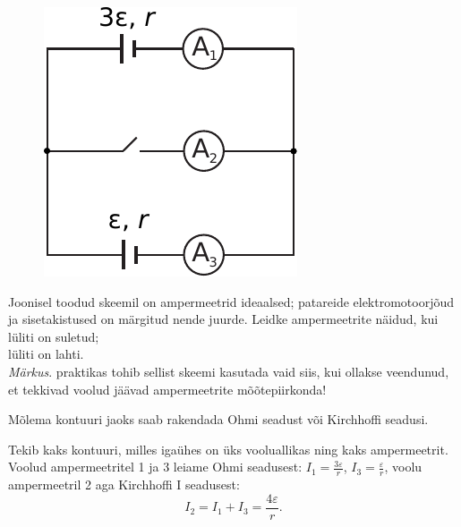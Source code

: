 
\begin{figure}%
\vspace{-12pt}
\includegraphics[width=\linewidth]{2013-v2g-05-skeem}%
\end{figure}
Joonisel toodud skeemil on ampermeetrid ideaalsed; patareide elektromotoorjõud
ja sisetakistused on märgitud nende juurde. Leidke ampermeetrite näidud, kui\\
\osa lüliti on suletud;\\
\osa lüliti on lahti.\\
\emph{Märkus}. praktikas tohib
sellist skeemi kasutada vaid siis, kui ollakse veendunud, et tekkivad voolud
jäävad ampermeetrite mõõtepiirkonda!

\hint
Mõlema kontuuri jaoks saab rakendada Ohmi seadust või Kirchhoffi seadusi.

\solu
\osa Tekib kaks kontuuri, milles igaühes on üks vooluallikas ning kaks ampermeetrit. Voolud ampermeetritel 1 ja 3 leiame Ohmi seadusest: $I_1=\frac{3\varepsilon}{r}$, $I_3=\frac{\varepsilon}{r}$, voolu ampermeetril 2 aga Kirchhoffi I seadusest: 
\[
I_2=I_1+I_3=\frac{4\varepsilon}{r}.
\]

